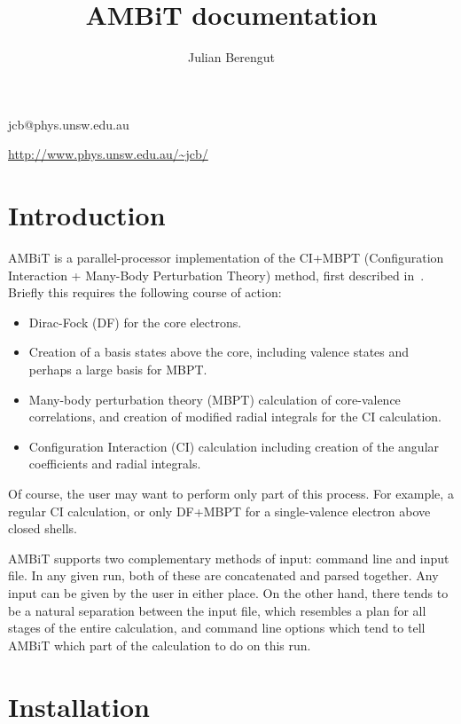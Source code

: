 \documentclass[a4paper,11pt]{article}
\begin{document}
\title{AMBiT documentation}
\author{Julian Berengut}

\maketitle

\begin{centering}

jcb@phys.unsw.edu.au

\url{http://www.phys.unsw.edu.au/~jcb/}

\end{centering}

\section{Introduction}

AMBiT is a parallel-processor implementation of the CI+MBPT (Configuration Interaction + Many-Body Perturbation Theory) method, first described in~\cite{dzuba96pra}. Briefly this requires the following course of action:
\begin{itemize}
\item Dirac-Fock (DF) for the core electrons.
\item Creation of a basis states above the core, including valence states and perhaps a large basis for MBPT.
\item Many-body perturbation theory (MBPT) calculation of core-valence correlations, and creation of modified radial integrals for the CI calculation.
\item Configuration Interaction (CI) calculation including creation of the angular coefficients and radial integrals.
\end{itemize}
Of course, the user may want to perform only part of this process. For example, a regular CI calculation, or only DF+MBPT for a single-valence electron above closed shells.

AMBiT supports two complementary methods of input: command line and input file. In any given run, both of these are concatenated and parsed together. Any input can be given by the user in either place. On the other hand, there tends to be a natural separation between the input file, which resembles a plan for all stages of the entire calculation, and command line options which tend to tell AMBiT which part of the calculation to do on this run.

\section{Installation}
\end{document}
